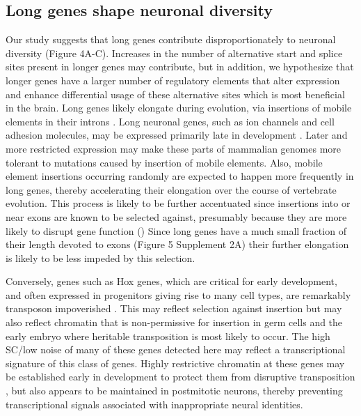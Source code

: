 \subsection{Long genes shape neuronal diversity}
Our study suggests that long genes contribute disproportionately to neuronal diversity (Figure 4A-C). Increases in the number of alternative start and splice sites present in longer genes may contribute, but in addition, we hypothesize that longer genes have a larger number of regulatory elements that alter expression and enhance differential usage of these alternative sites which is most beneficial in the brain. Long genes likely elongate during evolution, via insertions of mobile elements in their introns \citep{Sela_2007,Grishkevich_2014}. Long neuronal genes, such as ion channels and cell adhesion molecules, may be expressed primarily late in development \citep{Okaty_2009}. Later and more restricted expression may make these parts of mammalian genomes more tolerant to mutations caused by insertion of mobile elements. Also, mobile element insertions occurring randomly are expected to happen more frequently in long genes, thereby accelerating their elongation over the course of vertebrate evolution. This process is likely to be further accentuated since insertions into or near exons are known to be selected against, presumably because they are more likely to disrupt gene function () Since long genes have a much small fraction of their length devoted to exons (Figure 5 Supplement 2A) their further elongation is likely to be less impeded by this selection. %

Conversely, genes such as Hox genes, which are critical for early development, and often expressed in progenitors giving rise to many cell types, are remarkably transposon impoverished \citep{Chinwalla_2002,Simons_2005}. This may reflect selection against insertion but may also reflect chromatin that is non-permissive for insertion in germ cells and the early embryo where heritable transposition is most likely to occur. The high SC/low noise of many of these genes detected here may reflect a transcriptional signature of this class of genes. Highly restrictive chromatin at these genes may be established early in development to protect them from disruptive transposition \citep{Montavon_2014}, but also appears to be maintained in postmitotic neurons, thereby preventing transcriptional signals associated with inappropriate neural identities. 

